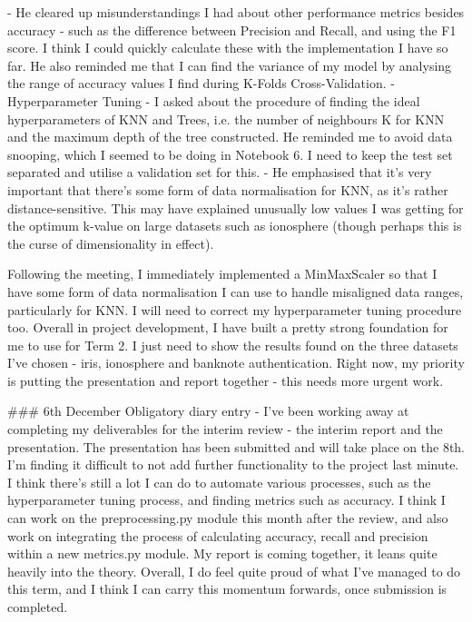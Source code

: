 \documentclass[letterpaper,10pt]{article}
\begin{document}
\begin{markdown}
- He cleared up misunderstandings I had about other performance metrics besides accuracy - such as the difference between Precision and Recall, and using the F1 score. I think I could quickly calculate these with the implementation I have so far. He also reminded me that I can find the variance of my model by analysing the range of accuracy values I find during K-Folds Cross-Validation.  
- Hyperparameter Tuning - I asked about the procedure of finding the ideal hyperparameters of KNN and Trees, i.e. the number of neighbours K for KNN and the maximum depth of the tree constructed. He reminded me to avoid data snooping, which I seemed to be doing in Notebook 6. I need to keep the test set separated and utilise a validation set for this.  
- He emphasised that it's very important that there's some form of data normalisation for KNN, as it's rather distance-sensitive. This may have explained unusually low values I was getting for the optimum k-value on large datasets such as ionosphere (though perhaps this is the curse of dimensionality in effect).  
  
Following the meeting, I immediately implemented a MinMaxScaler so that I have some form of data normalisation I can use to handle misaligned data ranges, particularly for KNN. I will need to correct my hyperparameter tuning procedure too.  
Overall in project development, I have built a pretty strong foundation for me to use for Term 2. I just need to show the results found on the three datasets I've chosen - iris, ionosphere and banknote authentication.  
Right now, my priority is putting the presentation and report together - this needs more urgent work. 

### 6th December
Obligatory diary entry - I've been working away at completing my deliverables for the interim review - the interim report and the presentation. The presentation has been submitted and will take place on the 8th.  
I'm finding it difficult to not add further functionality to the project last minute. I think there's still a lot I can do to automate various processes, such as the hyperparameter tuning process, and finding metrics such as accuracy. I think I can work on the preprocessing.py module this month after the review, and also work on integrating the process of calculating accuracy, recall and precision within a new metrics.py module.  
My report is coming together, it leans quite heavily into the theory. Overall, I do feel quite proud of what I've managed to do this term, and I think I can carry this momentum forwards, once submission is completed.
  

\end{markdown}
\end{document}
